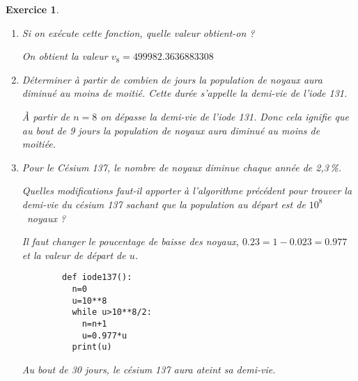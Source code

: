 \documentclass[10pt,a4paper]{article}
\theoremstyle{break}
\newtheorem{exo}{Exercice}
\begin{document}
\begin{exo}
\begin{enumerate}
\begin{enumerate}
			\item Si on exécute cette fonction, quelle valeur obtient-on ?\par 
				On obtient la valeur $v_8 = 499982.3636883308$ \\

			\item Déterminer à partir de combien de jours la population de noyaux aura diminué au moins de moitié.
			Cette durée s'appelle la demi-vie de l'iode 131.

			\`A partir de $n = 8$ on dépasse la demi-vie de l'iode 131. Donc cela ignifie que au bout de 9 jours la population de noyaux aura diminué au moins de moitiée. \\
			
			\item Pour le Césium 137, le nombre de noyaux diminue chaque année de 2,3\,\%.
			
			Quelles modifications faut-il apporter à l'algorithme précédent pour trouver la demi-vie du césium 137 sachant que la population au départ est de $10^8$~noyaux ?

			Il faut changer le poucentage de baisse des noyaux,  $0.23 = 1-0.023 = 0.977$ et la valeur de départ de $u$.

			 \begin{lstlisting}
        def iode137():
          n=0
          u=10**8
          while u>10**8/2:
            n=n+1
            u=0.977*u
          print(u)
        \end{lstlisting}
	Au bout de 30 jours, le césium 137 aura ateint sa demi-vie.


		\end{enumerate} 
	\end{enumerate}
	
	

	
	
\end{exo}

	
\end{document}
